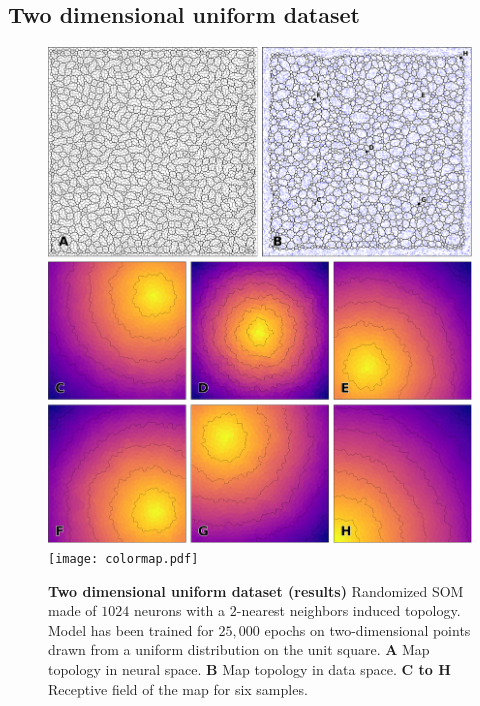 
\subsection{Two dimensional uniform dataset}

\begin{figure}
  \includegraphics[width=\columnwidth]{experiment-2D-uniform.pdf}
  \vspace{2mm}
  \centering
  \texttt{[image: colormap.pdf]}
  \caption{%
  {\bfseries \sffamily Two dimensional uniform dataset (results)}
  Randomized SOM made of $1024$ neurons with a $2$-nearest neighbors induced topology. Model has been trained for $25,000$ epochs on two-dimensional points drawn from a uniform distribution on the unit square. \textbf{A} Map topology in neural space. \textbf{B} Map topology in data space. \textbf{C to H} Receptive field of the map for six samples.
  }
  \label{fig:2D-uniform:results}
\end{figure}

